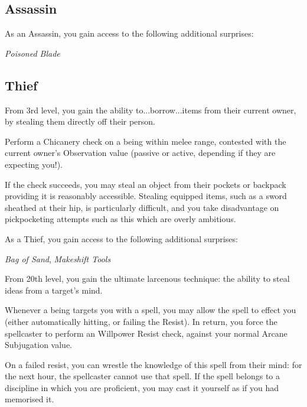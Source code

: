 \subsection*{\bf Assassin}


As an Assassin, you gain access to the following additional surprises:

{\it Poisoned Blade}

\subsection*{\bf Thief}



From 3rd level, you gain the ability to...borrow...items from their current owner, by stealing them directly off their person. 

Perform a Chicanery check on a being within melee range, contested with the current owner's Observation value (passive or active, depending if they are expecting you!). 

If the check succeeds, you may steal an object from their pockets or backpack \minus{} providing it is reasonably accessible. Stealing equipped items, such as a sword sheathed at their hip, is particularly difficult, and you take disadvantage on pickpocketing attempts such as this which are overly ambitious.   



As a Thief, you gain access to the following additional surprises:

{\it Bag of Sand}, {\it Makeshift Tools}


From 20th level, you gain the ultimate larcenous technique: the ability to steal ideas from a target's mind.

Whenever a being targets you with a spell, you may allow the spell to effect you (either automatically hitting, or failing the Resist). In return, you force the spellcaster to perform an Willpower Resist check, against your normal Arcane Subjugation value. 

On a failed resist, you can wrestle the knowledge of this spell from their mind: for the next hour, the spellcaster cannot use that spell. If the spell belongs to a discipline in which you are proficient, you may cast it yourself as if you had memorised it.  


